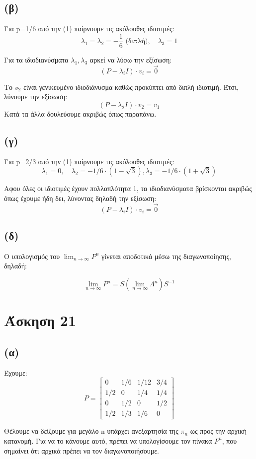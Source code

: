 \documentclass[a4paper,oneside, 11pt]{article}
\begin{document}
\subsection*{(β)}
Για p=1/6 από την (1) παίρνουμε τις ακόλουθες ιδιοτιμές:
$$
\lambda_1 = \lambda_2 = -\frac{1}{6}  \textrm{ (διπλή)}, \quad \lambda_3 = 1
$$

Για τα ιδιοδιανύσματα $\lambda_1, \lambda_3$ αρκεί να λύσω την εξίσωση:
$$
(P - \lambda_i I)\cdot v_i = \vec 0
$$

Το $v_2$ είναι γενικευμένο ιδιοδιάνυσμα καθώς προκύπτει από διπλή ιδιοτιμή. Έτσι, λύνουμε την εξίσωση:
$$
(P - \lambda_2 I)\cdot v_2 = v_1 
$$
Κατά τα άλλα δουλεύουμε ακριβώς όπως παραπάνω.
\subsection*{(γ)}
Για p=2/3 από την (1) παίρνουμε τις ακόλουθες ιδιοτιμές:
$$
\lambda_1 = 0, \quad \lambda_2 = -1/6 \cdot (1 - \sqrt3), \lambda_3 = -1/6 \cdot (1 + \sqrt3)
$$

Αφου όλες οι ιδιοτιμές έχουν πολλαπλότητα 1, τα ιδιοδιανύσματα βρίσκονται ακριβώς όπως έχουμε ήδη δει, λύνοντας δηλαδή την εξίσωση:
$$
(P - \lambda_i I)\cdot v_i = \vec 0
$$


\subsection*{(δ)}
Ο υπολογισμός του $\lim_{n\to \infty}P^n$ γίνεται αποδοτικά μέσω της διαγωνοποίησης, δηλαδή:

$$ \lim_{n\to \infty}P^n = S \left( \lim_{n \to \infty}\Lambda ^ n \right) S^{-1} $$


\section*{Άσκηση 21}
\subsection{(α)}
Έχουμε:
$$
P = \begin{bmatrix}
0 & 1/6 & 1/12 & 3/4 \\
1/2 & 0 & 1/4 & 1/4 \\
0 & 1/2 & 0 & 1/2 \\
1/2 & 1/3 & 1/6 & 0
\end{bmatrix}
$$


Θέλουμε να δείξουμε για μεγάλο n υπάρχει ανεξαρτησία της $\pi_n$ ως προς την αρχική κατανομή. Για να το κάνουμε αυτό, πρέπει να υπολογίσουμε τον πίνακα $P^n$, που σημαίνει ότι αρχικά πρέπει να τον διαγωνοποιήσουμε. \bigbreak 
\end{document}
